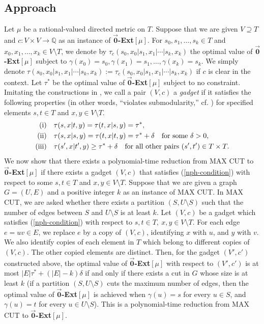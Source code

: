 \documentclass[11pt]{article}
\theoremstyle{definition}
\begin{document}
\subsection{Approach}
\label{hardness:approach}
Let $\mu$ be a rational-valued directed metric on $T$. Suppose that we are given $V\supseteq T$ and $c:V\times V\rightarrow \mathbb{Q}$ as an instance of $\overrightarrow{\textbf{0}}$\textbf{-Ext}$[\mu]$. For $s_0,s_1,\ldots,s_k\in T$ and $x_0,x_1,\ldots,x_k\in V\setminus T$, we denote by $\tau_{c} (s_0,x_0|s_1,x_1|\cdots|s_k,x_k)$ the optimal value of $\overrightarrow{\textbf{0}}$\textbf{-Ext}$[\mu]$ subject to $\gamma(x_0)=s_0,\gamma(x_1)=s_1,\ldots,\gamma(x_k)=s_k$. We simply denote $\tau(s_0,x_0|s_1,x_1|\cdots|s_k,x_k):=\tau_{c} (s_0,x_0|s_1,x_1|\cdots|s_k,x_k)$ if $c$ is clear in the context. Let $\tau^*$ be the optimal value of $\overrightarrow{\textbf{0}}$\textbf{-Ext}$[\mu]$ subject to no constraint. Imitating the constructions in \cite{dahlhaus1994, karzanov1998, karzanov2004}, we call a pair $(V,c)$ a \textit{gadget} if it satisfies the following properties (in other words, ``violates submodularity,'' cf. \cite{dahlhaus1994}) for specified elements $s,t\in T$ and $x,y\in V\setminus T$.
\begin{align}
\label{nph-condition}
\mathrm{(i)}& \mathrm{\ \ \ }\tau(s,x|t,y)=\tau(t,x|s,y)=\tau^*,\notag\\
\mathrm{(ii)}& \mathrm{\ \ \ }\tau(s,x|s,y)=\tau(t,x|t,y)=\tau^*+\delta \mathrm{\ \ \ }\mathrm{for\ some\ \delta>0}\notag,\\
\mathrm{(iii)}& \mathrm{\ \ \ }\tau(s',x|t',y)\geq \tau^*+\delta \mathrm{\ \ \ }\mathrm{for\ all\ other\ pairs}\ (s',t')\in T\times T.
\end{align}
We now show that there exists a polynomial-time reduction from MAX CUT to $\overrightarrow{\textbf{0}}$\textbf{-Ext}$[\mu]$ if there exists a gadget $(V,c)$ that satisfies (\ref{nph-condition}) with respect to some $s,t\in T$ and $x,y\in V\setminus T$. Suppose that we are given a graph $G=(U,E)$ and a positive integer $k$ as an instance of MAX CUT. In MAX CUT, we are asked whether there exists a partition $(S,U\setminus S)$ such that the number of edges between $S$ and $U\setminus S$ is at least $k$. Let $(V,c)$ be a gadget which satisfies (\ref{nph-condition}) with respect to $s,t\in T,\ x,y\in V\setminus T$. For each edge $e=uv\in E$, we replace $e$ by a copy of $(V,c)$, identifying $x$ with $u$, and $y$ with $v$. We also identify copies of each element in $T$ which belong to different copies of $(V,c)$. The other copied elements are distinct. Then, for the gadget $(V',c')$ constructed above, the optimal value of $\overrightarrow{\textbf{0}}$\textbf{-Ext}$[\mu]$ with respect to $(V',c')$ is at most $|E|\tau^*+(|E|-k)\delta$ if and only if there exists a cut in $G$ whose size is at least $k$ (if a partition $(S,U\setminus S)$ cuts the maximum number of edges, then the optimal value of $\overrightarrow{\textbf{0}}$\textbf{-Ext}$[\mu]$ is achieved when $\gamma(u)=s$ for every $u\in S$, and $\gamma(u)=t$ for every $u\in U\setminus S$). This is a polynomial-time reduction from MAX CUT to $\overrightarrow{\textbf{0}}$\textbf{-Ext}$[\mu]$.
\end{document}
